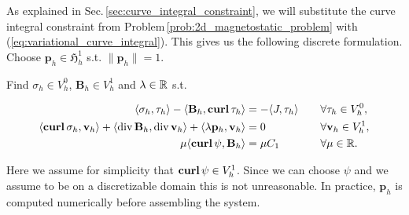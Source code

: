 \documentclass[../master_thesis.tex]{subfiles}
\begin{document}
As explained in Sec.\,\ref{sec:curve_integral_constraint}, 
we will substitute the curve integral constraint from Problem\,\ref{prob:2d_magnetostatic_problem} with 
(\ref{eq:variational_curve_integral}).
This gives us the following discrete formulation. Choose $\mathbf{p}_h \in \mathfrak{H}^1_h$ 
s.t. $\lVert \mathbf{p}_h \rVert = 1$. 

\begin{problem}\label{prob:magnetostatic_problem_discrete_variational}
    Find 
    $\sigma_h \in V_h^0$, $\mathbf{B}_h \in V_h^1$ and $\lambda \in \mathbb{R}$ s.t.

    \begin{align*}
        \langle \sigma_h, \tau_h \rangle - \langle \mathbf{B}_h, \veccurl\tau_h \rangle 
        &=  -\langle J, \tau_h \rangle \quad &&\forall \tau_h \in V_h^0, 
        \\ \langle \veccurl \sigma_h, \mathbf{v}_h \rangle + \langle \diver \mathbf{B}_h, \diver \mathbf{v}_h \rangle 
        + \langle \lambda \mathbf{p}_h, \mathbf{v}_h \rangle 
        &= 0 \quad &&\forall \mathbf{v}_h \in V^1_h, 
        \\ \mu \langle \bm{\curl} \psi, \mathbf{B}_h \rangle &= \mu C_1 \quad &&\forall \mu \in \real.
    \end{align*}
\end{problem}
Here we assume for simplicity that $\veccurl \psi \in V_h^1$. Since 
we can choose $\psi$ and we assume to be on a discretizable domain this is not unreasonable. In practice, $\mathbf{p}_h$ 
is computed numerically before assembling the system. 
\end{document}
